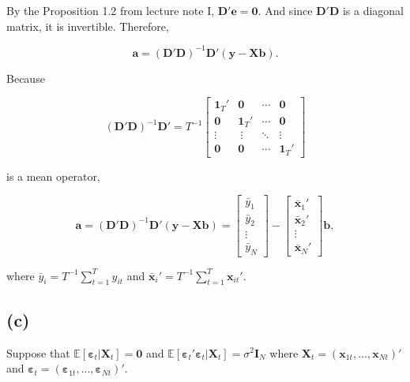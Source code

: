 \documentclass[
]{article}
\begin{document}
By the Proposition 1.2 from lecture note I,
\(\boldsymbol{D'e} = \boldsymbol{0}\). And since \(\boldsymbol{D'D}\) is
a diagonal matrix, it is invertible. Therefore,

\[\boldsymbol{a} = (\boldsymbol{D}'\boldsymbol{D})^{-1}\boldsymbol{D'}(\boldsymbol{y}-\boldsymbol{Xb}).\]

Because

\[ (\boldsymbol{D}'\boldsymbol{D})^{-1}\boldsymbol{D'} = T^{-1} \begin{bmatrix}\boldsymbol{1}_T' & \boldsymbol{0} & \cdots & \boldsymbol{0} \\ \boldsymbol{0} & \boldsymbol{1}_T' & \cdots & \boldsymbol{0} \\ \vdots &\ \vdots & \ddots & \vdots \\ \boldsymbol{0} & \boldsymbol{0} & \cdots & \boldsymbol{1}_T'\end{bmatrix}\]

is a mean operator,

\[\boldsymbol{a} = (\boldsymbol{D}'\boldsymbol{D})^{-1}\boldsymbol{D'}(\boldsymbol{y}-\boldsymbol{Xb}) = \begin{bmatrix}\bar{y}_1 \\ \bar{y}_2 \\  \vdots \\ \bar{y}_N \end{bmatrix}-\begin{bmatrix}\bar{\boldsymbol{x}}_1' \\ \bar{\boldsymbol{x}}_2' \\  \vdots \\ \bar{\boldsymbol{x}}_N' \end{bmatrix}\boldsymbol{b},\]

where \(\bar{y}_i = T^{-1}\sum_{t=1}^{T}y_{it}\) and
\(\bar{\boldsymbol{x}}_i' = T^{-1}\sum_{t=1}^{T}\boldsymbol{x}_{it}'\).

\hypertarget{c}{%
\subsection{(c)}\label{c}}

Suppose that
\(\mathbb{E}[\boldsymbol{\varepsilon}_t|\boldsymbol{X}_t] = \boldsymbol{0}\)
and
\(\mathbb{E}[\boldsymbol{\varepsilon}_t'\boldsymbol{\varepsilon}_t|\boldsymbol{X}_t]=\sigma^2\boldsymbol{I}_N\)
where
\(\boldsymbol{X}_t = (\boldsymbol{x}_{1t},...,\boldsymbol{x}_{Nt})'\)
and
\(\boldsymbol{\varepsilon}_t = (\boldsymbol{\varepsilon}_{1t},...,\boldsymbol{\varepsilon}_{Nt})'\).
\end{document}
